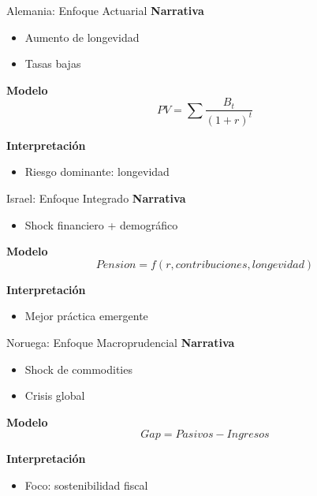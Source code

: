 \documentclass{beamer}
\begin{document}
\begin{frame}[fragile]{Alemania: Enfoque Actuarial}
\textbf{Narrativa}
\begin{itemize}
\item Aumento de longevidad
\item Tasas bajas
\end{itemize}

\textbf{Modelo}
\[
PV = \sum \frac{B_t}{(1+r)^t}
\]

\textbf{Interpretación}
\begin{itemize}
\item Riesgo dominante: longevidad
\end{itemize}
\end{frame}

\begin{frame}[fragile]{Israel: Enfoque Integrado}
\textbf{Narrativa}
\begin{itemize}
\item Shock financiero + demográfico
\end{itemize}

\textbf{Modelo}
\[
Pension = f(r, contribuciones, longevidad)
\]

\textbf{Interpretación}
\begin{itemize}
\item Mejor práctica emergente
\end{itemize}
\end{frame}

\begin{frame}[fragile]{Noruega: Enfoque Macroprudencial}
\textbf{Narrativa}
\begin{itemize}
\item Shock de commodities
\item Crisis global
\end{itemize}

\textbf{Modelo}
\[
Gap = Pasivos - Ingresos
\]

\textbf{Interpretación}
\begin{itemize}
\item Foco: sostenibilidad fiscal
\end{itemize}
\end{frame}
\end{document}
